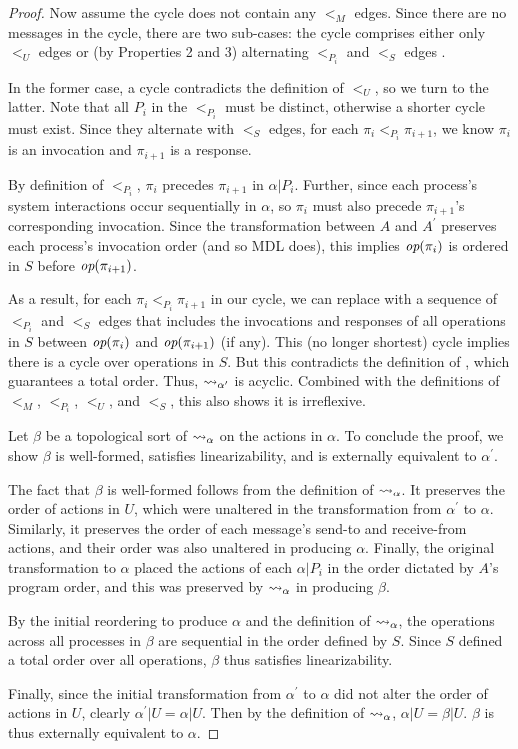\begin{proof}
Now assume the cycle does not contain any $<_M$ edges. Since there are no messages in
the cycle, there are two sub-cases: the cycle comprises either only $<_U$ edges or
(by Properties 2 and 3) alternating $<_{P_i}$ and $<_S$ edges .

In the former case, a cycle contradicts the definition of $<_U$, so we turn to the latter.
Note that all $P_i$ in the $<_{P_i}$ must be distinct, otherwise a shorter cycle must exist.
Since they alternate with $<_S$ edges, for each $\pi_i <_{P_i} \pi_{i+1}$, we know 
$\pi_i$ is an invocation and $\pi_{i+1}$ is a response.

By definition of $<_{P_i}$, $\pi_i$ precedes $\pi_{i+1}$ in $\alpha | P_i$.
Further, since each process’s system interactions occur sequentially in $\alpha$,
so $\pi_{i}$ must also precede $\pi_{i+1}$'s corresponding invocation.
Since the transformation between $A$ and $A^\prime$ preserves each process’s
invocation order (and so MDL does), this implies $\operatorname*{\textit{op}}(\pi_{i})$ is ordered in $S$
before $\operatorname*{\textit{op}}(\pi_{i+1})$.

As a result, for each $\pi_i <_{P_i} \pi_{i+1}$ in our cycle, we can replace with
a sequence of $<_{P_i}$ and $<_S$ edges that includes the invocations and responses
of all operations in $S$ between $\operatorname*{\textit{op}}(\pi_i)$ and $\operatorname*{\textit{op}}(\pi_{i+1})$ (if any).
This (no longer shortest) cycle implies there is a cycle over operations in $S$.
But this contradicts the definition of \MDL{}, which guarantees a total order.
Thus, $\rightsquigarrow_{\alpha^\prime}$ is acyclic. Combined with the definitions of
$<_M$, $<_{P_i}$, $<_U$, and $<_S$, this also shows it is irreflexive.

Let $\beta$ be a topological sort of $\rightsquigarrow_{\alpha}$ on the actions in
$\alpha$. To conclude the proof, we show $\beta$ is well-formed,
satisfies linearizability, and is externally equivalent to $\alpha^\prime$.

The fact that $\beta$ is well-formed follows from the definition of
$\rightsquigarrow_{\alpha}$. It preserves the order of actions in $U$,
which were unaltered in the transformation from $\alpha^\prime$ to $\alpha$.
Similarly, it preserves the order of each message's send-to and receive-from actions,
and their order was also unaltered in producing $\alpha$. Finally, the original
transformation to $\alpha$ placed the actions of each $\alpha | P_i$ in
the order dictated by $A$'s program order, and this was preserved by
$\rightsquigarrow_{\alpha}$ in producing $\beta$.

By the initial reordering to produce $\alpha$ and the definition of
$\rightsquigarrow_{\alpha}$, the operations across all processes in $\beta$
are sequential in the order defined by $S$. Since $S$ defined a
total order over all operations, $\beta$ thus satisfies linearizability.

Finally, since the initial transformation from $\alpha^\prime$ to $\alpha$
did not alter the order of actions in $U$, clearly $\alpha^\prime | U = \alpha | U$.
Then by the definition of $\rightsquigarrow_{\alpha}$, $\alpha | U = \beta | U$.
$\beta$ is thus externally equivalent to $\alpha$.
\end{proof}

